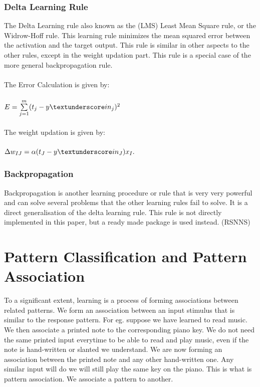 \documentclass[a4paper,12pt]{report}
\begin{document}
\subsubsection*{Delta Learning Rule}
The Delta Learning rule also known as the (LMS) Least Mean Square rule, or the Widrow-Hoff rule. This learning rule minimizes the mean 
squared error between the activation and the target output. This rule is similar in other aspects to the other rules, except in the weight updation part.
This rule is a special case of the more general backpropagation rule.
\\ \\
The Error Calculation is given by:\\ \\
$E = \sum\limits_{j=1}^m (t_j - y\textunderscore in_j)^2$\\ \\
The weight updation is given by:\\ \\
$\Delta w_{IJ} = \alpha (t_J - y\textunderscore in_J)x_I.$ \\

\subsubsection*{Backpropagation}
Backpropagation is another learning procedure or rule that is very very powerful and can solve several problems that the other learning
rules fail to solve. It is a direct generalisation of the delta learning rule. This rule is not directly implemented in this paper, but 
a ready made package is used instead. (RSNNS)


\section*{Pattern Classification and Pattern Association}
To a significant extent, learning is a process of forming associations between related patterns. We form an association between an input stimulus
that is similar to the response pattern. For eg. suppose we have learned to read music. We then associate a printed note to the corresponding piano key. 
We do not need the same printed input everytime to be able to read and play music, even if the note is hand-written or slanted we understand.
We are now forming an association between the printed note and any other hand-written one. Any similar input will do we will still play the same key on the piano.
This is what is pattern association. We associate a pattern to another. 
\end{document}
